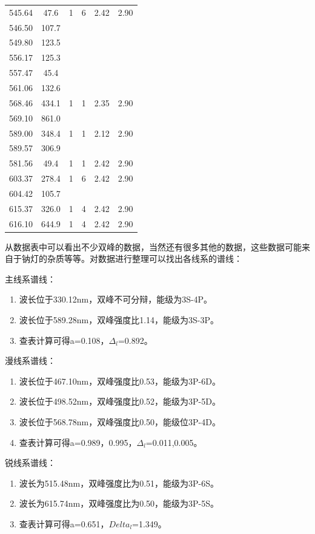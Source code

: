 \documentclass[aps,pre,12pt,preprint,onecolumn,showpacs,showkeys,UTF8]{revtex4-1}
\begin{document}
\begin{center}
\begin{table}
\begin{tabular}{cccccc}
			\hline
			545.64&47.6&1&6&2.42&2.90\\
			546.50&107.7\\
			549.80&123.5\\
			556.17&125.3\\
			557.47&45.4\\
			561.06&132.6\\
			\hline
			568.46&434.1&1&1&2.35&2.90\\
			569.10&861.0\\
			\hline
			589.00&348.4&1&1&2.12&2.90\\
			589.57&306.9\\
			\hline
			581.56&49.4&1&1&2.42&2.90\\
			\hline
			603.37&278.4&1&6&2.42&2.90\\
			604.42&105.7\\
			\hline
			615.37&326.0&1&4&2.42&2.90\\
			616.10&644.9&1&4&2.42&2.90\\
			\hline
			\hline
		\end{tabular}
	\end{table}
\end{center}

从数据表中可以看出不少双峰的数据，当然还有很多其他的数据，这些数据可能来自于钠灯的杂质等等。对数据进行整理可以找出各线系的谱线：

主线系谱线：
\begin{enumerate}
	\item 波长位于330.12nm，双峰不可分辩，能级为3S-4P。
	\item 波长位于589.28nm，双峰强度比1.14，能级为3S-3P。
	\item 查表计算可得a=0.108，$\Delta_l$=0.892。
\end{enumerate}

漫线系谱线：
\begin{enumerate}
	\item 波长位于467.10nm，双峰强度比0.53，能级为3P-6D。
	\item 波长位于498.52nm，双峰强度比0.52，能级为3P-5D。
	\item 波长位于568.78nm，双峰强度比0.50，能级位3P-4D。
	\item 查表计算可得a=0.989，0.995，$\Delta_l$=0.011,0.005。
\end{enumerate}

锐线系谱线：
\begin{enumerate}
	\item 波长为515.48nm，双峰强度比为0.51，能级为3P-6S。
	\item 波长为615.74nm，双峰强度比为0.50，能级为3P-5S。
	\item 查表计算可得a=0.651，$Delta_l$=1.349。
\end{enumerate}
\end{document}
